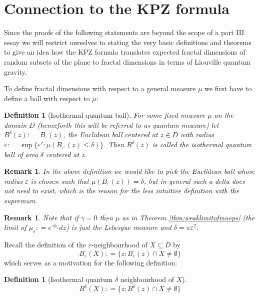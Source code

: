 \documentclass[11pt,reqno]{amsart}
\numberwithin{equation}{section}
\newtheorem{defi}[thm]{Definition}
\newtheorem{rem}[thm]{Remark}
\newcommand{\deq}{\mathrel{\mathop:}=}
\newcommand{\eps}{\varepsilon}
\begin{document}
\section{Connection to the KPZ formula}

Since the proofs of the following statements are beyond the scope of a part III essay we will restrict ourselves to stating the very basic definitions and theorems to give an idea how the KPZ formula translates expected fractal dimensions of random subsets of the plane to fractal dimensions in terms of Liouville quantum gravity.

To define fractal dimensions with respect to a general measure $\mu$ we first have to define a ball with respect to $\mu$:
\begin{defi}[Isothermal quantum ball]
	For some fixed measure $\mu$ on the domain $D$ (henceforth this will be referred to as \emph{quantum measure}) let $B^\delta(z)\deq B_\eps(z)$, the Euclidean ball centered at $z\in D$ with radius $\eps\deq\sup\{\eps':\mu(B_{\eps'}(z)\leq\delta)\}$. Then $B^\delta(z)$ is called the \emph{isothermal quantum ball} of area $\delta$ centered at $z$.
\end{defi}
\begin{rem}
	In the above definition we would like to pick the Euclidean ball whose radius $\eps$ is chosen such that $\mu(B_\eps(z))=\delta$, but in general such a delta does not need to exist, which is the reason for the less intuitive definition with the supremum.
\end{rem}
\begin{rem}
	Note that if $\gamma=0$ then $\mu$ as in Theorem \ref{thm:weaklimitofmueps} (the limit of $\mu_\eps\deq e^{\gamma\overline h_\eps}dz$) is just the Lebesgue measure and $\delta=\pi\eps^2$.
\end{rem}
Recall the definition of the $\eps$-neighbourhood of $X\subseteq D$ by $$B_\eps(X)\deq \{z:B_\eps(z)\cap X\neq\emptyset \}$$ which serves as a motivation for the following definition:
\begin{defi}[Isothermal quantum $\delta$ neighbourhood of $X$]
	$$B^\delta(X)\deq \{z:B^\delta(z)\cap X\neq\emptyset\}$$
\end{defi}
\end{document}
